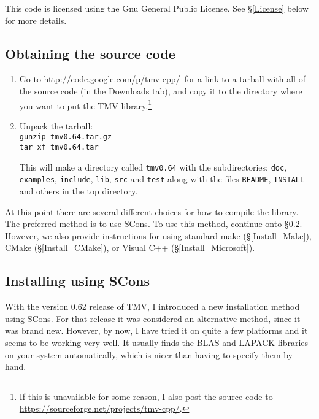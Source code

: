 \documentclass[twoside,letterpaper,11pt]{article}
\newcommand{\tmvversion}{0.64}
\newcommand{\websitex}{http://code.google.com/p/tmv-cpp/}
\newcommand{\website}{\url{\websitex}}
\newcommand{\altwebsitex}{https://sourceforge.net/projects/tmv-cpp/}
\newcommand{\altwebsite}{\url{\altwebsitex}}
\renewcommand{\tt}[1]{{\lstinline {#1}}}
\begin{document}
This code is licensed using the Gnu General Public License.  See 
\S\ref{License} below for more details.

\subsection{Obtaining the source code}
\label{Install_Obtain}

\begin{enumerate}

\item
Go to \website\ for a link to a tarball with all of the source code (in the Downloads tab), and copy
it to the directory where you want to put the TMV library.\footnote{
If this is unavailable for some reason, I also post the source code to \altwebsite.}

\item
Unpack the tarball:\\
\texttt{gunzip tmv\tmvversion .tar.gz}\\
\texttt{tar xf tmv\tmvversion .tar}

This will make a directory called \texttt{tmv\tmvversion} with the subdirectories:
\texttt{doc}, \texttt{examples}, \texttt{include}, \texttt{lib}, \texttt{src} and \texttt{test} 
along with the files \tt{README}, \tt{INSTALL} and others
in the top directory.

\end{enumerate}

At this point there are several different choices for how to compile the library.
The preferred method is to use SCons.  To use this method, continue onto \S\ref{Install_SCons}.
However, we also provide instructions for using standard make (\S\ref{Install_Make}),
CMake (\S\ref{Install_CMake}), or Visual C++ (\S\ref{Install_Microsoft}).



\subsection{Installing using SCons}
\label{Install_SCons}

With the version 0.62 release of TMV, I introduced a new installation method using SCons.  
For that 
release it was considered an alternative method, since it was brand new.  However, by now, I
have tried it on quite a few platforms and it seems to be working very well.  It usually finds
the BLAS and LAPACK libraries on your system automatically, which is nicer than having 
to specify them by hand.
\end{document}
